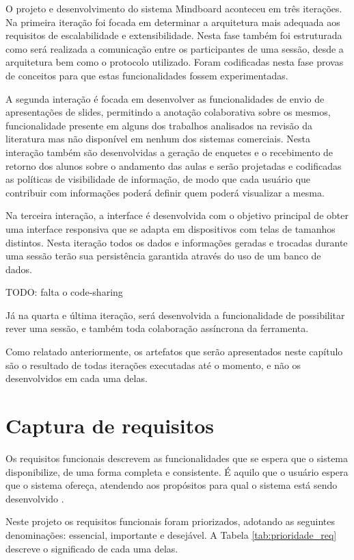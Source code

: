 O projeto e desenvolvimento do sistema Mindboard aconteceu em três iterações. Na primeira iteração foi focada em determinar a arquitetura mais adequada aos requisitos de escalabilidade e extensibilidade. Nesta fase também foi estruturada como será realizada a comunicação entre os participantes de uma sessão, desde a arquitetura bem como o protocolo utilizado. Foram codificadas nesta fase provas de conceitos para que estas funcionalidades fossem experimentadas.

A segunda interação é focada em desenvolver as funcionalidades de envio de apresentações de slides, permitindo a anotação colaborativa sobre os mesmos, funcionalidade presente em alguns dos trabalhos analisados na revisão da literatura mas não disponível em nenhum dos sistemas comerciais. Nesta interação também são desenvolvidas a geração de enquetes e o recebimento de retorno dos alunos sobre o andamento das aulas e serão projetadas e codificadas as políticas de visibilidade de informação, de modo que cada usuário que contribuir com informações poderá definir quem poderá visualizar a mesma.

Na terceira interação, a interface é desenvolvida com o objetivo principal de obter uma interface responsiva que se adapta em dispositivos com telas de tamanhos distintos. Nesta iteração todos os dados e informações geradas e trocadas durante uma sessão terão sua persistência garantida através do uso de um banco de dados.

TODO: falta o code-sharing

Já na quarta e última iteração, será desenvolvida a funcionalidade de possibilitar rever uma sessão, e também toda colaboração assíncrona da ferramenta.

Como relatado anteriormente, os artefatos que serão apresentados neste capítulo são o resultado de todas iterações executadas até o momento, e não os desenvolvidos em cada uma delas.

\section{Captura de requisitos}

Os requisitos funcionais descrevem as funcionalidades que se espera que o sistema disponibilize, de uma forma completa e consistente. É aquilo que o usuário espera que o sistema ofereça, atendendo aos propósitos para qual o sistema está sendo desenvolvido \cite{padua05}.

Neste projeto os requisitos funcionais foram priorizados, adotando as seguintes denominações: essencial, importante e desejável. A Tabela \ref{tab:prioridade_req} descreve o significado de cada uma delas.

